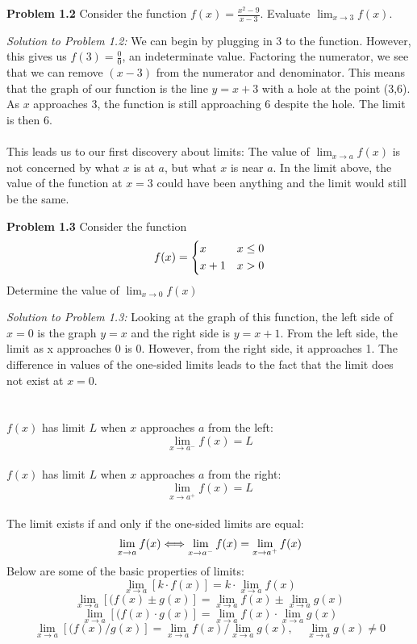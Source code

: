\documentclass[11pt]{scrartcl}
\begin{document}
\begin{tcolorbox}
[colback=purple!5!white,colframe=purple!75!black]
\textbf{Problem 1.2} Consider the function $f(x)=\frac{x^2-9}{x-3}$. Evaluate $\lim_{x \to 3} f(x)$.
\end{tcolorbox}
\noindent
\textit{Solution to Problem 1.2:} We can begin by plugging in 3 to the function. However, this gives us $f(3)=\frac{0}{0}$, an indeterminate value. Factoring the numerator, we see that we can remove $(x-3)$ from the numerator and denominator. This means that the graph of our function is the line $y=x+3$ with a hole at the point (3,6). As $x$ approaches 3, the function is still approaching 6 despite the hole. The limit is then 6. \\
\\
\noindent 
This leads us to our first discovery about limits: The value of $\lim_{x \to a} f(x)$ is not concerned by what $x$ is at $a$, but what $x$ is near $a$. In the limit above, the value of the function at $x=3$ could have been anything and the limit would still be the same. 
\\
\begin{tcolorbox}
[colback=purple!5!white,colframe=purple!75!black]
\textbf{Problem 1.3} Consider the function
\[
   f(x)= \begin{dcases}
        x & x\leq 0 \\
        x+1 & x > 0
       
    \end{dcases}
\]
Determine the value of $\lim_{x \to 0} f(x)$
\end{tcolorbox}
\noindent
\textit{Solution to Problem 1.3:} Looking at the graph of this function, the left side of $x=0$ is the graph $y=x$ and the right side is $y=x+1$. From the left side, the limit as x approaches 0 is 0. However, from the right side, it approaches 1. The difference in values of the one-sided limits leads to the fact that the limit does not exist at $x=0$.\\
\noindent\\
\\$f(x)$ has limit $L$ when $x$ approaches $a$ from the left:
\\$$\lim\limits_{x \to a^{-}} f(x)=L$$
\\$f(x)$ has limit $L$ when $x$ approaches $a$ from the right:
\\$$\lim\limits_{x \to a^{+}} f(x)=L$$
\\The limit exists if and only if the one-sided limits are equal:
\\$$\lim\limits_{x \to a^{\vphantom{+}}} f(x)
\Longleftrightarrow \lim\limits_{x \to a^{-}} f(x)
= \lim\limits_{x \to a^{+}} f(x)$$
\noindent
Below are some of the basic properties of limits:\\
$$\lim_{x \to a } \left[k \cdot f(x)\right]=k \cdot\lim_{x \to a} f(x)$$
$$\lim_{x \to a} \left[(f(x)\pm g(x)\right]=\lim_{x \to a} f(x)\pm \lim_{x \to a} g(x)$$
$$\lim_{x \to a} \left[(f(x)\cdot g(x)\right]=\lim_{x \to a} f(x)\cdot \lim_{x \to a} g(x)$$
$$\lim_{x \to a} \left[(f(x)/g(x)\right]=\lim_{x \to a} f(x)/\lim_{x \to a} g(x),\;\;\;\; \lim_{x \to a} g(x)\neq0$$
\end{document}
